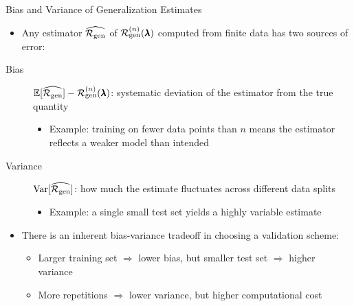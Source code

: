 \documentclass[main]{subfiles}
\begin{document}
\begin{frame}{Bias and Variance of Generalization Estimates}
    \begin{itemize}
        \item Any estimator $\widehat{\mathcal{R}_{\text{gen}}}$ of $\mathcal{R}_{\text{gen}}^{(n)}(\pmb{\lambda})$ computed from finite data has two sources of error:
    \end{itemize}
    \begin{description}
        \item[Bias] $\mathbb{E}[\widehat{\mathcal{R}_{\text{gen}}}] - \mathcal{R}_{\text{gen}}^{(n)}(\pmb{\lambda})$: systematic deviation of the estimator from the true quantity
        \begin{itemize}
            \item Example: training on fewer data points than $n$ means the estimator reflects a weaker model than intended
        \end{itemize}
        \item[Variance] $\mathrm{Var}[\widehat{\mathcal{R}_{\text{gen}}}]$: how much the estimate fluctuates across different data splits
        \begin{itemize}
            \item Example: a single small test set yields a highly variable estimate
        \end{itemize}
    \end{description}
    \begin{itemize}
        \item There is an inherent bias-variance tradeoff in choosing a validation scheme:
        \begin{itemize}
            \item Larger training set $\Rightarrow$ lower bias, but smaller test set $\Rightarrow$ higher variance
            \item More repetitions $\Rightarrow$ lower variance, but higher computational cost
        \end{itemize}
    \end{itemize}
\end{frame}
\end{document}
